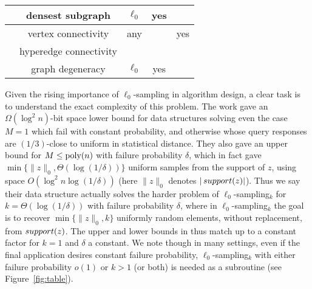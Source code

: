 \begin{figure*}[t]
\begin{center}
\begin{tabular}{|c|c|c|c|c|}
\hline
\cite{EsfandiariHW16} & densest subgraph & $\ell_0$ & yes & \\
\hline
\cite{GuhaMT15} & vertex connectivity & any & & yes\\
 & hyperedge connectivity &  & & \\
\hline
\cite{FarachColtonT16} & graph degeneracy & $\ell_0$ & yes & \\
\hline
\end{tabular}
\caption{Guarantees needed by various works using samplers as subroutines. The last two columns indicate whether the work needs to use a sampler that returns $k$ samples at a time when queried for some $k>1$, or for some subconstant failure probability $\delta$ even to achieve failure probability $1/3$ in the main application. The ``distribution'' column indicates the output distribution needed from the sampler for the application (``any'' means a \suppfind{} subroutine is sufficient, i.e.\ it suffices for a query to return any index $i$ for which $z_i\neq 0$).}\label{fig:table}
\end{center}
\end{figure*}

Given the rising importance of $\ell_0$-sampling in algorithm design, a clear task is to understand the exact complexity of this problem. The work \cite{JowhariST11} gave an $\Omega(\log^2 n)$-bit space lower bound for data structures solving even the case $M=1$ which fail with constant probability, and otherwise whose query responses are $(1/3)$-close to uniform in statistical distance. They also gave an upper bound for $M \le {\mathrm{poly}}(n)$ with failure probability $\delta$, which in fact gave $\min\{\|z\|_0, \Theta(\log(1/\delta))\}$ uniform samples from the support of $z$, using space $O(\log^2 n \log(1/\delta))$ (here $\|z\|_0$ denotes $|\mathop{support}(z)|$). Thus we say their data structure actually solves the harder problem of $\ell_0$-sampling$_k$ for $k =\Theta(\log(1/\delta))$ with failure probability $\delta$, where in $\ell_0$-sampling$_k$ the goal is to recover $\min\{\|z\|_0, k\}$ uniformly random elements, without replacement, from $\mathop{support}(z)$.  The upper and lower bounds in \cite{JowhariST11} thus match up to a constant factor for $k = 1$ and $\delta$ a constant. We note though in many settings, even if the final application desires constant failure probability, $\ell_0$-sampling$_k$ with either failure probability $o(1)$ or $k>1$ (or both) is needed as a subroutine (see Figure~\ref{fig:table}).



